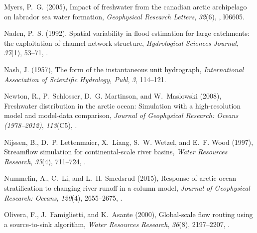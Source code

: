 \documentclass[jgrga, draft]{agutex}
\begin{document}
\begin{article}
\begin{thebibliography}{79}
Myers, P.~G. (2005), Impact of freshwater from the canadian arctic archipelago
  on labrador sea water formation, \textit{Geophysical Research Letters},
  \textit{32}(6), , l06605.

Naden, P.~S. (1992), Spatial variability in flood estimation for large
  catchments: the exploitation of channel network structure,
  \textit{Hydrological Sciences Journal}, \textit{37}(1), 53--71,
  .

Nash, J. (1957), The form of the instantaneous unit hydrograph,
  \textit{International Association of Scientific Hydrology, Publ}, \textit{3},
  114--121.

Newton, R., P.~Schlosser, D.~G. Martinson, and W.~Maslowski (2008), Freshwater
  distribution in the arctic ocean: Simulation with a high-resolution model and
  model-data comparison, \textit{Journal of Geophysical Research: Oceans
  (1978--2012)}, \textit{113}(C5), .

Nijssen, B., D.~P. Lettenmaier, X.~Liang, S.~W. Wetzel, and E.~F. Wood (1997),
  Streamflow simulation for continental-scale river basins, \textit{Water
  Resources Research}, \textit{33}(4), 711--724, .

Nummelin, A., C.~Li, and L.~H. Smedsrud (2015), Response of arctic ocean
  stratification to changing river runoff in a column model, \textit{Journal of
  Geophysical Research: Oceans}, \textit{120}(4), 2655--2675,
  .

Olivera, F., J.~Famiglietti, and K.~Asante (2000), Global-scale flow routing
  using a source-to-sink algorithm, \textit{Water Resources Research},
  \textit{36}(8), 2197--2207, .



\end{thebibliography}
\end{article}
\end{document}
